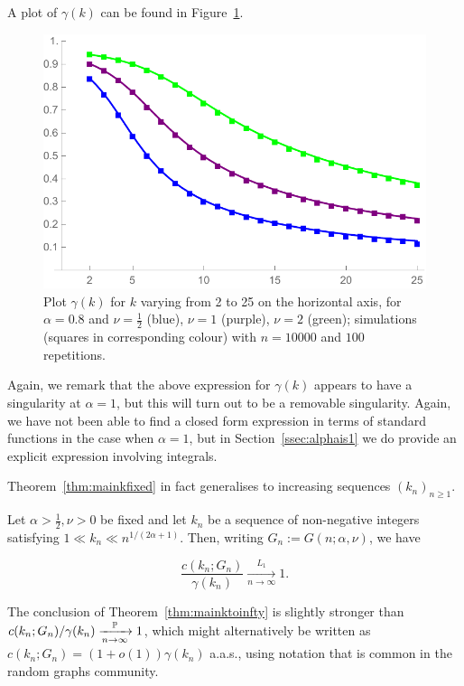 \noindent
A plot of $\gamma(k)$ can be found in Figure~\ref{fig:gammak}. %
%
%
\begin{figure}[H]
    \centering
    \includegraphics[scale=0.6]{figures/ckn10000a08nu0512rep100k2to25Squares.pdf}
    \caption{Plot $\gamma(k)$ for $k$ varying from 2 to 25 on the horizontal axis, for $\alpha=0.8$ and $\nu=\frac{1}{2}$ 
    (blue), $\nu=1$ (purple), $\nu=2$ (green); simulations (squares in corresponding colour) with $n=10000$ and $100$ repetitions.\label{fig:gammak}}
\end{figure}%
%
Again, we remark that the above expression for $\gamma(k)$ appears to have a singularity at $\alpha=1$, but this will turn out to be a removable singularity. 
Again, we have not been able to find a closed form expression in terms of standard functions in the case when $\alpha=1$, but in 
Section~\ref{ssec:alphais1} we do provide an explicit expression involving integrals.

Theorem~\ref{thm:mainkfixed} in fact generalises to increasing sequences $(k_n)_{n \ge 1}$.

\begin{theorem}\label{thm:mainktoinfty}
Let $\alpha>\frac12, \nu>0$ be fixed and let $k_n$ be a sequence of non-negative integers
satisfying $1 \ll k_n \ll n^{1/(2\alpha+1)}$. Then, writing $G_n := G(n;\alpha,\nu)$, we have

$$ \frac{c(k_n;G_n)}{\gamma(k_n)} \xrightarrow[n\to\infty]{L_1} 1. $$ 

\end{theorem}

\noindent
The conclusion of Theorem~\ref{thm:mainktoinfty} is slightly stronger than $c(k_n; G_n)/\gamma(k_n) 
\xrightarrow[n\to\infty]{\mathbb{P}} 1$, which might alternatively be written as $c(k_n;G_n) = (1+o(1)) \gamma(k_n)$ a.a.s., using notation that is common in the random graphs community.


